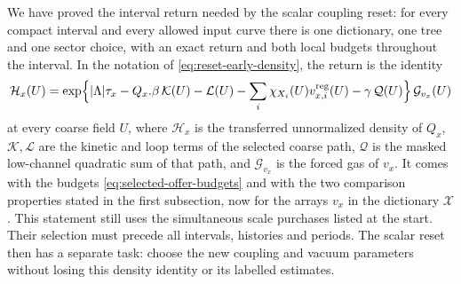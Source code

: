 We have proved the interval return needed by the scalar coupling reset:
for every compact interval and every allowed input curve there is one
dictionary, one tree and one sector choice, with an exact return and
both local budgets throughout the interval. In the notation of
\eqref{eq:reset-early-density}, the return is the identity
\[
 \mathcal H_x(U)=
 \exp\Bigl\{|\Lambda|\tau_x-Q_x.\beta\,\mathcal K(U)-\mathcal L(U)
   -\sum_i\chi_{X_i}(U)v^{\rm reg}_{x,i}(U)
   -\gamma\,\mathcal Q(U)\Bigr\}\,\mathcal G_{v_x}(U)
\]
at every coarse field $U$, where $\mathcal H_x$ is the transferred
unnormalized density of $Q_x$, $\mathcal K,\mathcal L$ are the
kinetic and loop terms of the selected coarse path, $\mathcal Q$ is
the masked low-channel quadratic sum of that path, and
$\mathcal G_{v_x}$ is the forced gas of $v_x$. It comes with the
budgets \eqref{eq:selected-offer-budgets} and with the two
comparison properties stated in the first subsection, now for the
arrays $v_x$ in the dictionary $\mathcal X$. This statement still uses
the simultaneous scale purchases listed at the start. Their selection
must precede all intervals, histories and periods. The scalar reset
then has a separate task: choose the new coupling and vacuum parameters
without losing this density identity or its labelled estimates.
